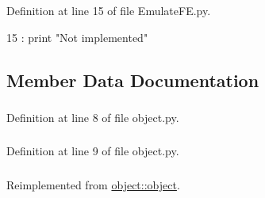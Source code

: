 Definition at line 15 of file EmulateFE.py.


\begin{DoxyCode}
15 :
    print "Not implemented"
\end{DoxyCode}


\subsection{Member Data Documentation}
\hypertarget{classobject_1_1object_a4fbaf843d1f40843b2c3895cb73ffada}{
\subsubsection[{cat}]{}}
\label{classobject_1_1object_a4fbaf843d1f40843b2c3895cb73ffada}


Definition at line 8 of file object.py.\hypertarget{classobject_1_1object_a15f13858ecdbf661a97a7da93d717922}{
\subsubsection[{obj}]{}}
\label{classobject_1_1object_a15f13858ecdbf661a97a7da93d717922}


Definition at line 9 of file object.py.\hypertarget{classproc_1_1proc_a9ee372f307278c50a935b46ca00a350a}{
\subsubsection[{panel}]{}}
\label{classproc_1_1proc_a9ee372f307278c50a935b46ca00a350a}


Reimplemented from \hyperlink{classobject_1_1object_add82cb657066d4ab5b39035792971503}{object::object}.


